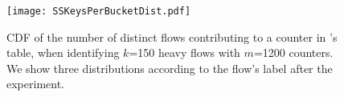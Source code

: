 \begin{figure}[h]
\texttt{[image: SSKeysPerBucketDist.pdf]}
\caption{CDF of the number of distinct flows contributing to a counter in
  \spacesaving's table, when identifying $k$=150 heavy flows with $m$=1200
  counters. We show three distributions according to the flow's label after the
  experiment.}
\label{fig:SSkeysperbucket}
\end{figure}




